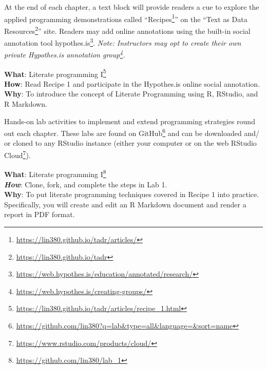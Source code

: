 \documentclass[
  letterpaper,
]{scrbook}
\DeclareRobustCommand{\href}[2]{#2\footnote{\url{#1}}}
\begin{document}
At the end of each chapter, a text block will provide readers a cue to
explore the applied programming demonstrations called
``\href{https://lin380.github.io/tadr/articles/}{Recipes}'' on the
``\href{https://lin380.github.io/tadr}{Text as Data Resources}'' site.
Readers may add online annotations using the built-in social annotation
tool
\href{https://web.hypothes.is/education/annotated/research/}{hypothes.is}.
\emph{Note: Instructors may opt to
\href{https://web.hypothes.is/creating-groups/}{create their own private
Hypothes.is annotation group}.}

\begin{tcolorbox}[enhanced jigsaw, title=\textcolor{quarto-callout-tip-color}{\faLightbulb}\hspace{0.5em}{Recipe}, titlerule=0mm, toptitle=1mm, colbacktitle=quarto-callout-tip-color!10!white, bottomtitle=1mm, left=2mm, colframe=quarto-callout-tip-color-frame, breakable, toprule=.15mm, colback=white, opacitybacktitle=0.6, leftrule=.75mm, rightrule=.15mm, bottomrule=.15mm, arc=.35mm, coltitle=black, opacityback=0]

\textbf{What}:
\href{https://lin380.github.io/tadr/articles/recipe_1.html}{Literate
programming I}\\
\textbf{How}: Read Recipe 1 and participate in the Hypothes.is online
social annotation.\\
\textbf{Why}: To introduce the concept of Literate Programming using R,
RStudio, and R Markdown.

\end{tcolorbox}

Hands-on lab activities to implement and extend programming strategies
round out each chapter. These labs are found on
\href{https://github.com/lin380?q=lab\&type=all\&language=\&sort=name}{GitHub}
and can be downloaded and/ or cloned to any RStudio instance (either
your computer or on the web
\href{https://www.rstudio.com/products/cloud/}{RStudio Cloud}).

\begin{tcolorbox}[enhanced jigsaw, title=\textcolor{quarto-callout-tip-color}{\faLightbulb}\hspace{0.5em}{Lab}, titlerule=0mm, toptitle=1mm, colbacktitle=quarto-callout-tip-color!10!white, bottomtitle=1mm, left=2mm, colframe=quarto-callout-tip-color-frame, breakable, toprule=.15mm, colback=white, opacitybacktitle=0.6, leftrule=.75mm, rightrule=.15mm, bottomrule=.15mm, arc=.35mm, coltitle=black, opacityback=0]

\textbf{What}: \href{https://github.com/lin380/lab_1}{Literate
programming I}\\
\textbf{\emph{How}}: Clone, fork, and complete the steps in Lab 1.\\
\textbf{Why}: To put literate programming techniques covered in Recipe 1
into practice. Specifically, you will create and edit an R Markdown
document and render a report in PDF format.

\end{tcolorbox}
\end{document}
